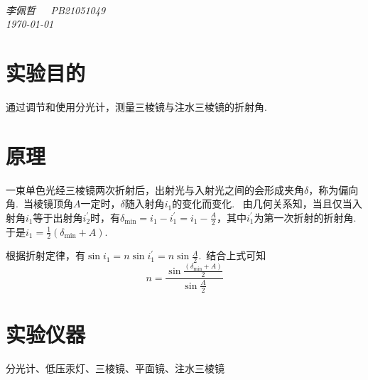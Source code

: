 \documentclass[a4paper]{article}%
\title{\heiti{实验报告}}%
\author{{\emph{李佩哲}}}
\date{\emph{\small\today}}
\begin{document}
\begin{center}
\\
\emph{李佩哲~~~PB21051049~~~\\\today}
\end{center}
\section{实验目的}
通过调节和使用分光计，测量三棱镜与注水三棱镜的折射角.~

\section{原理}
一束单色光经三棱镜两次折射后，出射光与入射光之间的会形成夹角$\delta$，称为偏向角.~当棱镜顶角$A$一定时，$\delta$随入射角$i_1$的变化而变化.~
由几何关系知，当且仅当入射角$i_1$等于出射角$i_2^\prime$时，有$\delta_{\min}=i_1-i_1^\prime=i_1-\frac{A}{2}$，其中$i_1^\prime$为第一次折射的折射角.~
于是$i_1=\frac{1}{2}\left(\delta_{\min}+A\right)$.~

根据折射定律，有$\sin i_1=n\sin i_1^\prime=n\sin \frac{A}{2}$.~结合上式可知$$n=\frac{\sin \frac{\left(\delta_{\min}+A\right)}{2}}{\sin\frac{A}{2}}$$

\section{实验仪器}
分光计、低压汞灯、三棱镜、平面镜、注水三棱镜
\end{document}
